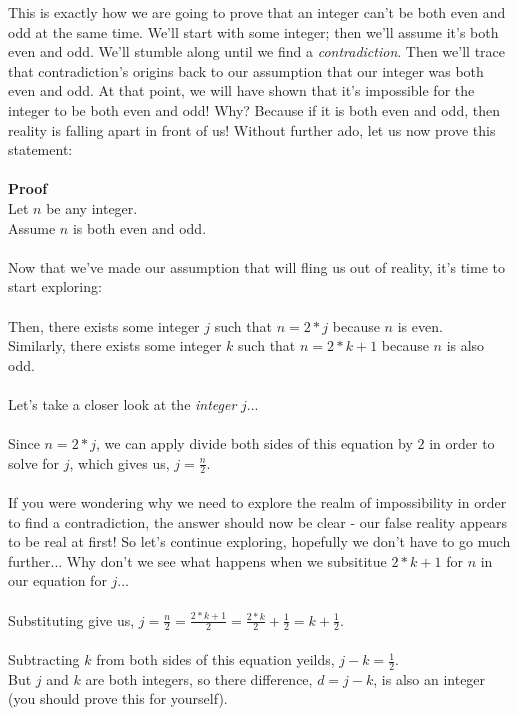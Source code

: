 \documentclass[a4paper,12pt]{article}
\begin{document}
This is exactly how we are going to prove that an integer can't be both even and odd at the same time. We'll start with some integer; then we'll assume it's both even and odd. We'll stumble along until we find a \textit{contradiction}. Then we'll trace that contradiction's origins back to our assumption that our integer was both even and odd. At that point, we will have shown that it's impossible for the integer to be both even and odd! Why? Because if it is both even and odd, then reality is falling apart in front of us! Without further ado, let us now prove this statement:\\
\\
\textbf{Proof}\\
Let $n$ be any integer.\\
Assume $n$ is both even and odd.\\
\\
Now that we've made our assumption that will fling us out of reality, it's time to start exploring:\\
\\
Then, there exists some integer $j$ such that $n = 2*j$ because $n$ is even.\\
Similarly, there exists some integer $k$ such that $n = 2*k + 1$ because $n$ is also odd.\\
\\
Let's take a closer look at the \textit{integer} $j$...\\
\\
Since $n = 2*j$, we can apply divide both sides of this equation by $2$ in order to solve for $j$, which gives us, $j = \frac{n}{2}$.\\
\\
If you were wondering why we need to explore the realm of impossibility in order to find a contradiction, the answer should now be clear - our false reality appears to be real at first! So let's continue exploring, hopefully we don't have to go much further... Why don't we see what happens when we subsititue $2*k + 1$ for $n$ in our equation for $j$...\\
\\
Substituting give us, $j = \frac{n}{2} = \frac{2*k + 1}{2} = \frac{2*k}{2} + \frac{1}{2} = k + \frac{1}{2}$.\\
\\ 
Subtracting $k$ from both sides of this equation yeilds, $j - k = \frac{1}{2}$.\\
But $j$ and $k$ are both integers, so there difference, $d = j - k$, is also an integer (you should prove this for yourself).\\
\end{document}

